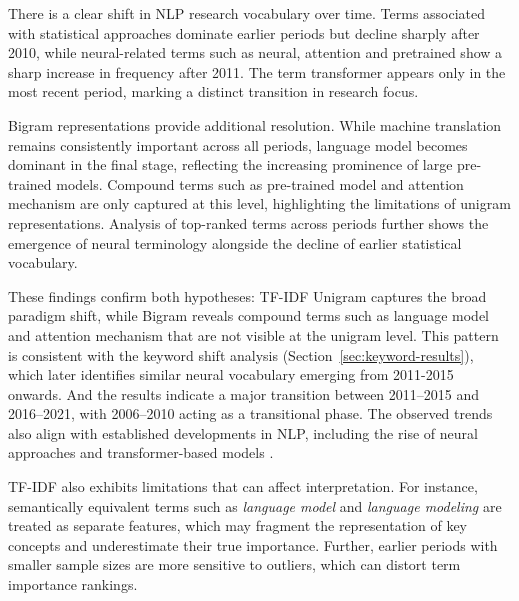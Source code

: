 There is a clear shift in NLP research vocabulary over time. Terms associated with statistical approaches dominate earlier periods but decline sharply after 2010, while neural-related terms such as neural, attention and pretrained show a sharp increase in frequency after 2011. The term transformer appears only in the most recent period, marking a distinct transition in research focus.

Bigram representations provide additional resolution. While machine translation remains consistently important across all periods, language model becomes dominant in the final stage, reflecting the increasing prominence of large pre-trained models. Compound terms such as pre-trained model and attention mechanism are only captured at this level, highlighting the limitations of unigram representations. Analysis of top-ranked terms across periods further shows the emergence of neural terminology alongside the decline of earlier statistical vocabulary.

These findings confirm both hypotheses: TF-IDF Unigram captures the broad paradigm shift, while Bigram reveals compound terms such as language model and attention mechanism that are not visible at the unigram level. This pattern is consistent with the keyword shift analysis (Section~\ref{sec:keyword-results}), which later identifies similar neural vocabulary emerging from 2011-2015 onwards. And the results indicate a major transition between 2011–2015 and 2016–2021, with 2006–2010 acting as a transitional phase. The observed trends also align with established developments in NLP, including the rise of neural approaches and transformer-based models \citep{vaswani_attention_2023, devlin_bert_2019}.

TF-IDF also exhibits limitations that can affect interpretation. For instance, semantically equivalent terms such as \textit{language model} and \textit{language modeling} are treated as separate features, which may fragment the representation of key concepts and underestimate their true importance. Further, earlier periods with smaller sample sizes are more sensitive to outliers, which can distort term importance rankings.



\label{sec:results-sbert}


